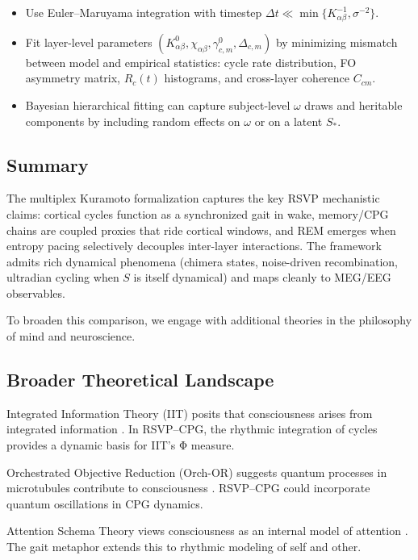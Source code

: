\documentclass{article}
\begin{document}
\begin{itemize}
  \item Use Euler–Maruyama integration with timestep $\Delta t \ll \min\{K_{\alpha\beta}^{-1},\sigma^{-2}\}$.
  \item Fit layer-level parameters $(K^0_{\alpha\beta},\chi_{\alpha\beta},\gamma_{c,m}^0,\Delta_{c,m})$ by minimizing mismatch between model and empirical statistics: cycle rate distribution, FO asymmetry matrix, $R_c(t)$ histograms, and cross-layer coherence $C_{cm}$.
  \item Bayesian hierarchical fitting can capture subject-level $\omega$ draws and heritable components by including random effects on $\omega$ or on a latent $S_*$.
\end{itemize}

\subsection{Summary}

The multiplex Kuramoto formalization captures the key RSVP mechanistic claims: cortical cycles function as a synchronized gait in wake, memory/CPG chains are coupled proxies that ride cortical windows, and REM emerges when entropy pacing selectively decouples inter-layer interactions. The framework admits rich dynamical phenomena (chimera states, noise-driven recombination, ultradian cycling when $S$ is itself dynamical) and maps cleanly to MEG/EEG observables.

To broaden this comparison, we engage with additional theories in the philosophy of mind and neuroscience.

\subsection{Broader Theoretical Landscape}

Integrated Information Theory (IIT) posits that consciousness arises from integrated information \citep{tononi2004information}. In RSVP--CPG, the rhythmic integration of cycles provides a dynamic basis for IIT's Φ measure.

Orchestrated Objective Reduction (Orch-OR) suggests quantum processes in microtubules contribute to consciousness \citep{hameroff2014consciousness}. RSVP--CPG could incorporate quantum oscillations in CPG dynamics.

Attention Schema Theory views consciousness as an internal model of attention \citep{webb2015attention}. The gait metaphor extends this to rhythmic modeling of self and other.
\end{document}
